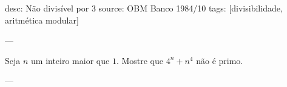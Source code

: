 desc: Não divisível por $3$
source:  OBM Banco 1984/10
tags:  [divisibilidade, aritmética modular]

---

Seja $n$ um inteiro maior que $1$. Mostre que $4^n + n^4$ não é primo.

---

